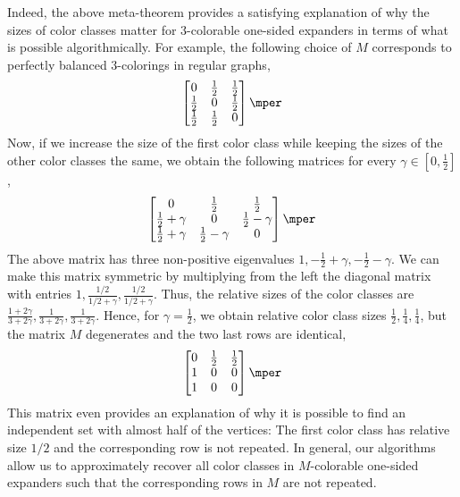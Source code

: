 Indeed, the above meta-theorem provides a satisfying explanation of why the sizes of color classes matter for \(3\)-colorable one-sided expanders in terms of what is possible algorithmically.
For example, the following choice of \(M\) corresponds to perfectly balanced \(3\)-colorings in regular graphs,
\begin{equation}
\begin{bmatrix}
0 & \frac{1}{2} & \frac{1}{2} \\
\frac{1}{2} & 0 & \frac{1}{2} \\
\frac{1}{2} & \frac{1}{2} & 0
\end{bmatrix}
\mper
\end{equation}
Now, if we increase the size of the first color class while keeping the sizes of the other color classes the same, we obtain the following matrices for every \(\gamma\in [0,\tfrac 12]\),
\begin{equation}
\begin{bmatrix}
0 & \frac{1}{2} & \frac{1}{2} \\
\frac{1}{2}+\gamma & 0 & \frac{1}{2}-\gamma \\
\frac{1}{2}+\gamma & \frac{1}{2}-\gamma & 0
\end{bmatrix}
\mper
\end{equation}
The above matrix has three non-positive eigenvalues \(1,-\tfrac 12 +\gamma,-\tfrac 12 -\gamma\).
We can make this matrix symmetric by multiplying from the left the diagonal matrix with entries \(1,\tfrac{1/2}{1/2+\gamma},\tfrac{1/2}{1/2+\gamma}\).
Thus, the relative sizes of the color classes are \(\tfrac{1+2\gamma}{3+2\gamma},\frac1{3+2\gamma},\frac1{3+2\gamma}\).
Hence, for \(\gamma=\tfrac12\), we obtain relative color class sizes \(\tfrac 12,\tfrac 14,\tfrac 14\), but the matrix \(M\) degenerates and the two last rows are identical,
\begin{equation}
\begin{bmatrix}
0 & \frac{1}{2} & \frac{1}{2} \\
1 & 0 & 0 \\
1 & 0 & 0
\end{bmatrix}
\mper
\end{equation}
This matrix even provides an explanation of why it is possible to find an independent set with almost half of the vertices:
The first color class has relative size \(1/2\) and the corresponding row is not repeated.
In general, our algorithms allow us to approximately recover all color classes in \(M\)-colorable one-sided expanders such that the corresponding rows in \(M\) are not repeated.





